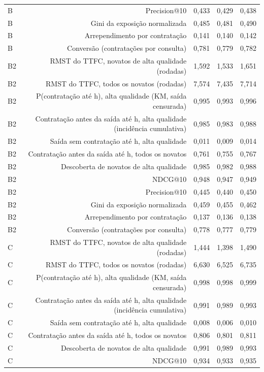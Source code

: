\begin{table}[ht]
\begin{tabular}{lrrrr}
B & Precision@10 & 0,433 & 0,429 & 0,438 \\
B & Gini da exposição normalizada & 0,485 & 0,481 & 0,490 \\
B & Arrependimento por contratação & 0,141 & 0,140 & 0,142 \\
B & Conversão (contratações por consulta) & 0,781 & 0,779 & 0,782 \\
B2 & RMST do TTFC, novatos de alta qualidade (rodadas) & 1,592 & 1,533 & 1,651 \\
B2 & RMST do TTFC, todos os novatos (rodadas) & 7,574 & 7,435 & 7,714 \\
B2 & P(contratação até h), alta qualidade (KM, saída censurada) & 0,995 & 0,993 & 0,996 \\
B2 & Contratação antes da saída até h, alta qualidade (incidência cumulativa) & 0,985 & 0,983 & 0,988 \\
B2 & Saída sem contratação até h, alta qualidade & 0,011 & 0,009 & 0,014 \\
B2 & Contratação antes da saída até h, todos os novatos & 0,761 & 0,755 & 0,767 \\
B2 & Descoberta de novatos de alta qualidade & 0,985 & 0,982 & 0,988 \\
B2 & NDCG@10 & 0,948 & 0,947 & 0,949 \\
B2 & Precision@10 & 0,445 & 0,440 & 0,450 \\
B2 & Gini da exposição normalizada & 0,459 & 0,455 & 0,462 \\
B2 & Arrependimento por contratação & 0,137 & 0,136 & 0,138 \\
B2 & Conversão (contratações por consulta) & 0,778 & 0,777 & 0,779 \\
C & RMST do TTFC, novatos de alta qualidade (rodadas) & 1,444 & 1,398 & 1,490 \\
C & RMST do TTFC, todos os novatos (rodadas) & 6,630 & 6,525 & 6,735 \\
C & P(contratação até h), alta qualidade (KM, saída censurada) & 0,998 & 0,998 & 0,999 \\
C & Contratação antes da saída até h, alta qualidade (incidência cumulativa) & 0,991 & 0,989 & 0,993 \\
C & Saída sem contratação até h, alta qualidade & 0,008 & 0,006 & 0,010 \\
C & Contratação antes da saída até h, todos os novatos & 0,806 & 0,801 & 0,811 \\
C & Descoberta de novatos de alta qualidade & 0,991 & 0,989 & 0,993 \\
C & NDCG@10 & 0,934 & 0,933 & 0,935 \\

\end{tabular}
\end{table}
